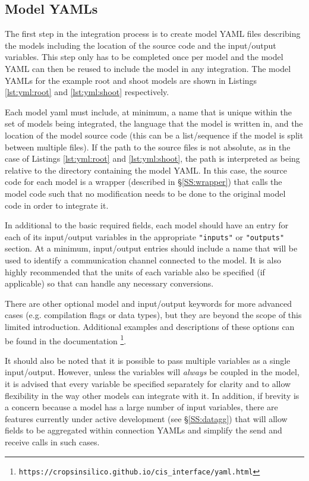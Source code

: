 \documentclass[journal]{IEEEtran}
\newcommand{\todo}[1]{{\color{red}{#1}}}
\newcommand{\pkg}{{\tt \todo{cis\_interface}}{}}
\newcommand{\rootyml}{}
\newcommand{\shootyml}{}
\begin{document}
\subsection{Model YAMLs}\label{SS:model_yaml}
%
The first step in the integration process is to create model YAML files describing the models including the location of the source code and the input/output variables. This step only has to be completed once per model and the model YAML can then be reused to include the model in any integration. The model YAMLs for the example root and shoot models are shown in Listings \ref{lst:yml:root} and \ref{lst:yml:shoot} respectively.
%
\rootyml
%
\shootyml
%
Each model yaml must include, at minimum, a name that is unique within the set of models being integrated, the language that the model is written in, and the location of the model source code (this can be a list/sequence if the model is split between multiple files). If the path to the source files is not absolute, as in the case of Listings \ref{lst:yml:root} and \ref{lst:yml:shoot}, the path is interpreted as being relative to the directory containing the model YAML. In this case, the source code for each model is a wrapper (described in \S\ref{SS:wrapper}) that calls the model code such that no modification needs to be done to the original model code in order to integrate it.

In additional to the basic required fields, each model should have an entry for each of its input/output variables in the appropriate {\tt "inputs"} or {\tt "outputs"} section. At a minimum, input/output entries should include a name that will be used to identify a communication channel connected to the model. It is also highly recommended that the units of each variable also be specified (if applicable) so that {\pkg} can handle any necessary conversions.

There are other optional model and input/output keywords for more advanced cases (e.g. compilation flags or data types), but they are beyond the scope of this limited introduction. Additional examples and descriptions of these options can be found in the documentation \footnote{{\tt https://cropsinsilico.github.io/cis\_interface/yaml.html}}.

It should also be noted that it is possible to pass multiple variables as a single input/output. However, unless the variables will \emph{always} be coupled in the model, it is advised that every variable be specified separately for clarity and to allow flexibility in the way other models can integrate with it. In addition, if brevity is a concern because a model has a large number of input variables, there are features currently under active development (see \S\ref{SS:datagg}) that will allow fields to be aggregated within connection YAMLs and simplify the send and receive calls in such cases.
\end{document}
